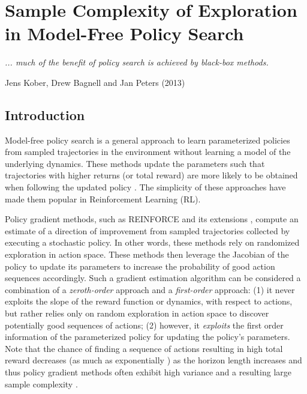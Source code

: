 
\chapter{Sample Complexity of Exploration in Model-Free Policy Search}
\label{cha:sample-compl-expl}

\epigraph{\textit{... much of the benefit of policy search is achieved
by black-box methods.}}{Jens Kober, Drew Bagnell and Jan Peters (2013)}

\section{Introduction}
Model-free policy search is a general approach to learn parameterized
policies from sampled trajectories in the environment without
learning a model of the underlying dynamics. These methods
update the parameters such that trajectories with higher returns (or total reward) are
more likely to be obtained when following the updated policy
\citep{kober2013reinforcement}. The simplicity of these approaches have
made them popular in Reinforcement Learning (RL).

Policy gradient methods, such as REINFORCE \citep{williams1992simple}
and its extensions \citep{kakade2002natural,bagnell2004policy, silver2014deterministic,schulman2015trust},
compute an estimate of a direction of improvement from sampled
trajectories collected by executing a stochastic policy. In other words, these methods rely on
randomized exploration in action space. These methods then leverage
the Jacobian of the policy to update its parameters to increase the
probability of good action sequences accordingly. Such a gradient
estimation algorithm can be considered a combination of a
\textit{zeroth-order} approach and a \textit{first-order} approach:
(1) it never exploits the slope of the reward function or dynamics,
with respect to actions, but rather relies only on random exploration
in action space to discover potentially good sequences of actions; (2)
however, it \emph{exploits} the first order information of the
parameterized policy for updating the policy's parameters. Note that
the chance of finding a sequence of actions resulting in high total
reward decreases (as much as exponentially
\citep{kakade2002approximately}) as the horizon length increases and
thus policy gradient methods often exhibit high variance and a
resulting large sample complexity \citep{peters2008reinforcement,
  zhao2011analysis}.


